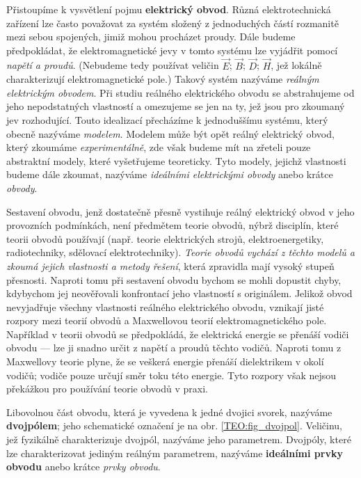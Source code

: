 {      Přistoupíme k vysvětlení pojmu \textbf{elektrický obvod}. Různá elektrotechnická zařízení lze 
      často považovat za systém složený z jednoduchých částí rozmanitě mezi sebou spojených, jimiž 
      mohou procházet proudy. Dále budeme předpokládat, že elektromagnetické jevy v tomto systému 
      lze vyjádřit pomocí \emph{napětí a proudů}. (Nebudeme tedy používat veličin \(\vec{E}\); 
      \(\vec{B}\); \(\vec{D}\); \(\vec{H}\), jež lokálně charakterizují elektromagnetické pole.) 
      Takový systém nazýváme \emph{reálným elektrickým obvodem}. Při studiu reálného elektrického 
      obvodu se abstrahujeme od jeho nepodstatných vlastností a omezujeme se jen na ty, jež jsou 
      pro zkoumaný jev rozhodující. Touto idealizací přecházíme k jednoduššímu systému, který 
      obecně nazýváme \emph{modelem}. Modelem může být opět reálný elektrický obvod, který zkoumáme 
      \emph{experimentálně}, zde však budeme mít na zřeteli pouze abstraktní modely, které 
      vyšetřujeme teoreticky. Tyto modely, jejichž vlastnosti budeme dále zkoumat, nazýváme 
      \emph{ideálními elektrickými obvody} anebo krátce \emph{obvody}\cite[s.~19]{Meyer1978}.
      
      Sestavení obvodu, jenž dostatečně přesně vystihuje reálný elektrický obvod v jeho provozních 
      podmínkách, není předmětem teorie obvodů, nýbrž disciplín, které teorii obvodů používají 
      (např. teorie elektrických strojů, elektroenergetiky, radiotechniky, sdělovací 
      elektrotechniky). \emph{Teorie obvodů vychází z těchto modelů a zkoumá jejich vlastnosti a 
      metody řešení}, která zpravidla mají vysoký stupeň přesnosti. Naproti tomu při sestavení 
      obvodu bychom se mohli dopustit chyby, kdybychom jej neověřovali konfrontací jeho vlastností 
      s originálem. Jelikož obvod nevyjadřuje všechny vlastnosti reálného elektrického obvodu, 
      vznikají jisté rozpory mezi teorií obvodů a Maxwellovou teorií elektromagnetického pole. 
      Například v teorii obvodů se předpokládá, že elektrická energie se přenáší vodiči obvodu — 
      lze ji snadno určit z napětí a proudů těchto vodičů. Naproti tomu z Maxwellovy teorie plyne, 
      že se veškerá energie přenáší dielektrikem v okolí vodičů; vodiče pouze určují směr toku této 
      energie. Tyto rozpory však nejsou překážkou pro používání teorie obvodů v praxi.
      
        
      Libovolnou část obvodu, která je vyvedena k jedné dvojici svorek, nazýváme 
      \textbf{dvojpólem}; jeho schematické označení je na obr. \ref{TEO:fig_dvojpol}. Veličinu, jež 
      fyzikálně charakterizuje dvojpól, nazýváme jeho parametrem. Dvojpóly, které lze 
      charakterizovat jediným reálným parametrem, nazýváme \textbf{ideálními prvky obvodu} anebo 
      krátce \emph{prvky obvodu}.
      
}
